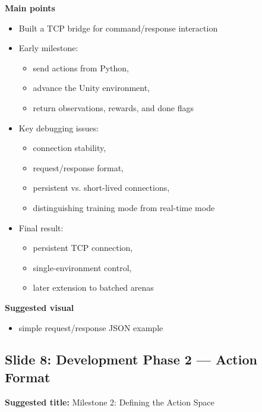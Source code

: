 \documentclass[11pt]{article}
\begin{document}
\textbf{Main points}
\begin{itemize}
    \item Built a TCP bridge for command/response interaction
    \item Early milestone:
    \begin{itemize}
        \item send actions from Python,
        \item advance the Unity environment,
        \item return observations, rewards, and done flags
    \end{itemize}
    \item Key debugging issues:
    \begin{itemize}
        \item connection stability,
        \item request/response format,
        \item persistent vs. short-lived connections,
        \item distinguishing training mode from real-time mode
    \end{itemize}
    \item Final result:
    \begin{itemize}
        \item persistent TCP connection,
        \item single-environment control,
        \item later extension to batched arenas
    \end{itemize}
\end{itemize}

\textbf{Suggested visual}
\begin{itemize}
    \item simple request/response JSON example
\end{itemize}

\subsection*{Slide 8: Development Phase 2 --- Action Format}

\textbf{Suggested title:} Milestone 2: Defining the Action Space
\end{document}
